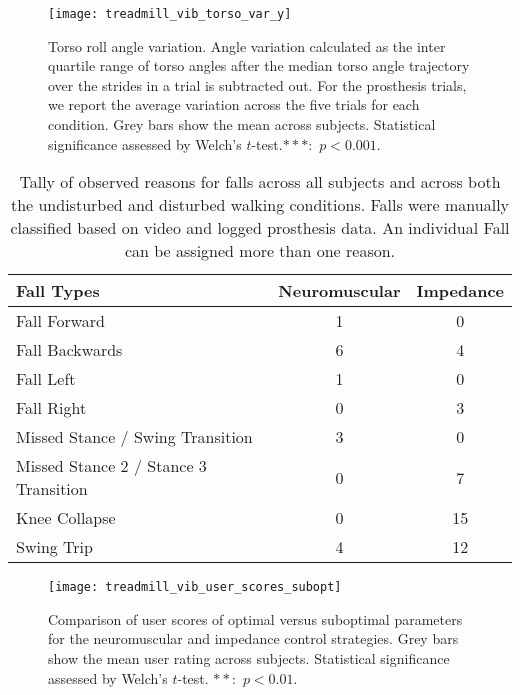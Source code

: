 \begin{figure}[h]
    \centering 
    \texttt{[image: treadmill\_vib\_torso\_var\_y]}
    \caption{Torso roll angle variation. Angle variation calculated as the inter
    quartile range of torso angles after the median torso angle trajectory over
    the strides in a trial is subtracted out. For the prosthesis trials, we
    report the average variation across the five trials for each condition.
    Grey bars show the mean across subjects.  Statistical significance assessed
    by Welch's $t$-test.$***$:~$p < 0.001$.}\label{fig:treadmill_exp_torso_var_y}
\end{figure}

\begin{table}[h]
  \begin{center}
    \begin{tabular}{lcc}
      Fall Types & Neuromuscular & Impedance \\
      \midrule
      Fall Forward &  1 &  0 \\
      Fall Backwards &  6 &  4 \\
      Fall Left &  1 &  0 \\
      Fall Right &  0 &  3 \\
      Missed Stance / Swing Transition &  3 &  0 \\
      Missed Stance 2 / Stance 3 Transition &  0 &  7 \\
      Knee Collapse & 0 & 15 \\
      Swing Trip & 4 & 12 \\
    \end{tabular}
  \end{center}
  \caption{Tally of observed reasons for falls across all subjects and across
  both the undisturbed and disturbed walking conditions. Falls were manually
  classified based on video and logged prosthesis data. An individual Fall can
  be assigned more than one reason.}\label{tab:treadmill_exp_fall_reasons}
\end{table}

\begin{figure}[h]
    \centering 
    \texttt{[image: treadmill\_vib\_user\_scores\_subopt]}
    \caption{Comparison of user scores of optimal versus suboptimal parameters
    for the neuromuscular and impedance control strategies. Grey bars show the
    mean user rating across subjects. Statistical significance assessed by
    Welch's $t$-test. $**$:~$p <
    0.01$.}\label{fig:treadmill_exp_user_ratings_subopt}
\end{figure}

